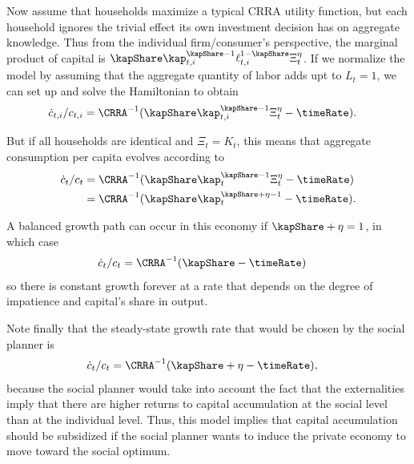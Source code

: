 \documentclass{handout} \usepackage{handoutSetup}\usepackage{handoutShortcuts} %
\begin{document}
Now assume that households maximize a typical CRRA utility function,
but each household ignores the trivial effect its own investment
decision has on aggregate knowledge.  Thus from the individual
firm/consumer's perspective, the marginal product of capital is
$\kapShare \kap_{t,i}^{\kapShare-1}
\ell_{t,i}^{1-\kapShare}\Xi_{t}^{\eta}$.  If we normalize the model by
assuming that the aggregate quantity of labor adds upt to $L_{t}=1$,
we can set up and solve the Hamiltonian to obtain
\begin{equation}\begin{gathered}\begin{aligned}
  \dot{c}_{t,i}/c_{t,i} & =  \CRRA^{-1}(\kapShare \kap_{t,i}^{\kapShare-1} \Xi_{t}^{\eta} - \timeRate).
\end{aligned}\end{gathered}\end{equation}

But if all households are identical and $\Xi_{t}=K_{t}$, this means that aggregate consumption
per capita evolves according to 
\begin{equation}\begin{gathered}\begin{aligned}
  \dot{c}_{t}/c_{t} & =  \CRRA^{-1}(\kapShare \kap_{t}^{\kapShare-1}\Xi_{t}^{\eta}  - \timeRate)
\\  & =  \CRRA^{-1}(\kapShare \kap_{t}^{\kapShare+\eta-1}  - \timeRate).
\end{aligned}\end{gathered}\end{equation}

A balanced growth path can occur in this economy if $\kapShare+\eta=1$, in which case 
\begin{equation}\begin{gathered}\begin{aligned}
  \dot{c}_{t}/c_{t} & =  \CRRA^{-1}(\kapShare  - \timeRate)
\end{aligned}\end{gathered}\end{equation}
so there is constant growth forever at a rate that depends on the degree
of impatience and capital's share in output.

Note finally that the steady-state growth rate that would be chosen by the
social planner is
\begin{equation}\begin{gathered}\begin{aligned}
  \dot{c}_{t}/c_{t} & =  \CRRA^{-1}(\kapShare +\eta - \timeRate),
\end{aligned}\end{gathered}\end{equation}
because the social planner would take into account the fact that 
the externalities imply that there are higher returns to capital 
accumulation at the social level than at the individual level.
Thus, this model implies that capital accumulation should be subsidized
if the social planner wants to induce the private economy to move toward
the social optimum.



 
\end{document}
